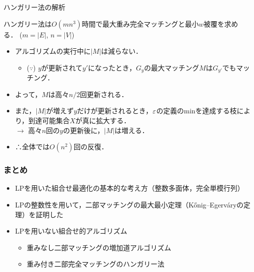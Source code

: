 \documentclass[14pt,aspectratio=169,xcolor=dvipsnames,table,onlytextwidth,dvipdfmx]{beamer}
\begin{document}
\begin{frame}{ハンガリー法の解析}

    \small
    \begin{theorem}
        ハンガリー法は$O(mn^3)$時間で最大重み完全マッチングと最小$w$被覆を求める．
        \hfill {\footnotesize ($m = |E|$, $n = |V|$)}
    \end{theorem}

    \pause
    \begin{itemize}[<+->]
        \item アルゴリズムの実行中に$|M|$は減らない．
        \begin{itemize}
            \item ($\because$) $y$が更新されて$y'$になったとき，$G_y$の最大マッチング$M$は$G_{y'}$でもマッチング．
        \end{itemize}
        \item よって，$M$は高々$n/2$回更新される．
        \item また，$|M|$が増えず$y$だけが更新されるとき，$\varepsilon$の定義のminを達成する枝により，到達可能集合$X$が真に拡大する．\\
        $\longrightarrow$ 高々$n$回の$y$の更新後に，$|M|$は増える．

        \item ∴全体では$O(n^2)$回の反復．
    \end{itemize}

    \vfill
\end{frame}

\begin{frame}
    \frametitle{まとめ}

    \begin{itemize}
        \setlength{\itemsep}{1em}
        \item LPを用いた組合せ最適化の基本的な考え方（整数多面体，完全単模行列）

        \item LPの整数性を用いて，二部マッチングの最大最小定理（K\H{o}nig--Egerv\'aryの定理）を証明した

        \item LPを用いない組合せ的アルゴリズム
        \begin{itemize}
            \item 重みなし二部マッチングの増加道アルゴリズム
            \item 重み付き二部完全マッチングのハンガリー法
        \end{itemize}
    \end{itemize}
    
\end{frame}
\end{document}
